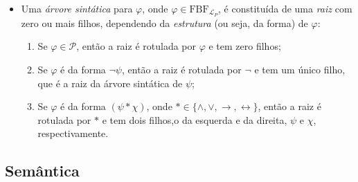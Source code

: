 \begin{itemize}[left=0.5cm, align=left, nosep]
            \item Uma \textit{árvore sintática} para $\varphi$, onde $\varphi \in \text{FBF}_{\mathcal{L}_P}$, é constituída de 
            uma \textit{raiz} com zero ou mais filhos, dependendo da \textit{estrutura} (ou seja, da forma) de $\varphi$:
            \begin{enumerate}[left=0.5cm, align=left, nosep]
                \item Se $\varphi \in \mathcal{P}$, então a raiz é rotulada por $\varphi$ e tem zero filhos;
                \item Se $\varphi$ é da forma $\neg \psi$, então a raiz é rotulada por $\neg$ e tem um único filho, que é a raiz 
                da árvore sintática de $\psi$;
                \item Se $\varphi$ é da forma $(\psi * \chi)$, onde $* \in \{\wedge, \vee, \rightarrow, \leftrightarrow\}$, então 
                a raiz é rotulada por $*$ e tem dois filhos,o da esquerda e da direita, $\psi$ e $\chi$, respectivamente.
            \end{enumerate}

        \end{itemize}

    \subsection{Semântica}

